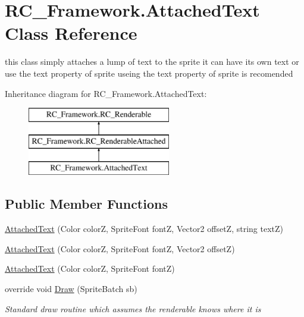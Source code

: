 \hypertarget{class_r_c___framework_1_1_attached_text}{}\section{R\+C\+\_\+\+Framework.\+Attached\+Text Class Reference}
\label{class_r_c___framework_1_1_attached_text}


this class simply attaches a lump of text to the sprite it can have its own text or use the text property of sprite useing the text property of sprite is recomended  


Inheritance diagram for R\+C\+\_\+\+Framework.\+Attached\+Text\+:\begin{figure}[H]
\begin{center}
\leavevmode
\includegraphics[height=3.000000cm]{class_r_c___framework_1_1_attached_text}
\end{center}
\end{figure}
\subsection*{Public Member Functions}
\begin{DoxyCompactItemize}
\item 
\mbox{\hyperlink{class_r_c___framework_1_1_attached_text_a39ea4d4bc1ab6294a506e02826dc8a19}{Attached\+Text}} (Color colorZ, Sprite\+Font fontZ, Vector2 offsetZ, string textZ)
\item 
\mbox{\hyperlink{class_r_c___framework_1_1_attached_text_a24a5fb5d3b20c5e50ce4d077f0921554}{Attached\+Text}} (Color colorZ, Sprite\+Font fontZ, Vector2 offsetZ)
\item 
\mbox{\hyperlink{class_r_c___framework_1_1_attached_text_a457b1f3860d89be63a912e22e254041b}{Attached\+Text}} (Color colorZ, Sprite\+Font fontZ)
\item 
override void \mbox{\hyperlink{class_r_c___framework_1_1_attached_text_a5972b29f469c9c005a46652ab448411c}{Draw}} (Sprite\+Batch sb)
\begin{DoxyCompactList}\small\item\em Standard draw routine which assumes the renderable knows where it is \end{DoxyCompactList}\end{DoxyCompactItemize}

